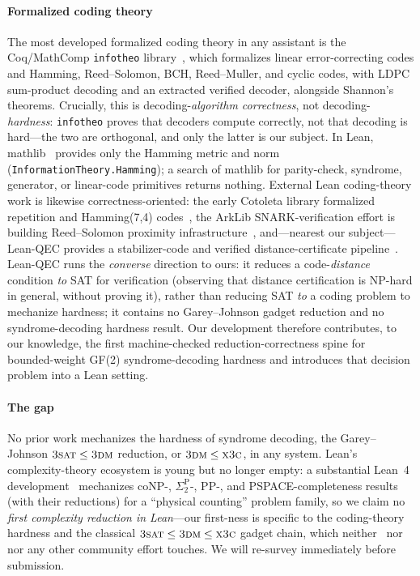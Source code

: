 \documentclass[sigplan,review,anonymous]{acmart}
\begin{document}
\paragraph{Formalized coding theory} The most developed formalized coding theory in any assistant is the
Coq/MathComp \lstinline{infotheo} library~\cite{AGS20}, which formalizes linear error-correcting codes and
Hamming, Reed--Solomon, BCH, Reed--Muller, and cyclic codes, with LDPC sum-product decoding and an extracted
verified decoder, alongside Shannon's theorems. Crucially, this is decoding-\emph{algorithm correctness}, not
decoding-\emph{hardness}: \lstinline{infotheo} proves that decoders compute correctly, not that decoding is
hard---the two are orthogonal, and only the latter is our subject. In Lean, mathlib~\cite{mathlib} provides only
the Hamming metric and norm (\lstinline{InformationTheory.Hamming}); a search of mathlib for parity-check,
syndrome, generator, or linear-code primitives returns nothing. External Lean coding-theory work is likewise
correctness-oriented: the early Cotoleta library formalized repetition and Hamming(7,4) codes~\cite{HNK16}, the
ArkLib SNARK-verification effort is building Reed--Solomon proximity infrastructure~\cite{ArkLib}, and---nearest
our subject---Lean-QEC provides a stabilizer-code and verified distance-certificate
pipeline~\cite{ELWT26}. Lean-QEC runs the \emph{converse} direction to ours: it reduces a
code-\emph{distance} condition \emph{to} SAT for verification (observing that distance certification is NP-hard
in general, without proving it), rather than reducing SAT \emph{to} a coding problem to mechanize hardness; it
contains no Garey--Johnson gadget reduction and no syndrome-decoding hardness result. Our development therefore
contributes, to our knowledge, the first machine-checked reduction-correctness spine for bounded-weight GF(2)
syndrome-decoding hardness and introduces that decision problem into a Lean setting.

\paragraph{The gap} No prior work mechanizes the hardness of syndrome decoding, the Garey--Johnson
$\textsc{3sat} \le \textsc{3dm}$ reduction, or $\textsc{3dm} \le \textsc{x3c}$, in any system. Lean's
complexity-theory ecosystem is young but no longer empty: a substantial Lean~4 development~\cite{Sim26}
mechanizes coNP-, $\Sigma_2^{\mathrm P}$-, PP-, and PSPACE-completeness results (with their reductions) for a
``physical counting'' problem family, so we claim no \emph{first complexity reduction in Lean}---our first-ness
is specific to the coding-theory hardness and the classical $\textsc{3sat} \le \textsc{3dm} \le \textsc{x3c}$
gadget chain, which neither~\cite{Sim26} nor~\cite{ELWT26} nor any other community effort touches. We will
re-survey immediately before submission.
\end{document}
